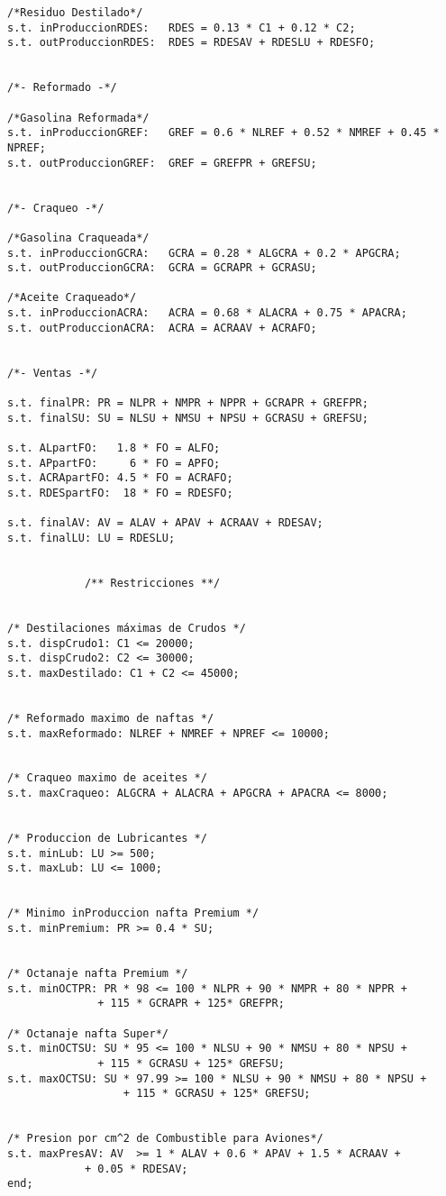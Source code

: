 \documentclass[a4paper,10pt]{article}
\begin{document}
\begin{verbatim}
/*Residuo Destilado*/
s.t. inProduccionRDES:   RDES = 0.13 * C1 + 0.12 * C2;
s.t. outProduccionRDES:  RDES = RDESAV + RDESLU + RDESFO;


/*- Reformado -*/

/*Gasolina Reformada*/
s.t. inProduccionGREF:   GREF = 0.6 * NLREF + 0.52 * NMREF + 0.45 * NPREF;
s.t. outProduccionGREF:  GREF = GREFPR + GREFSU;


/*- Craqueo -*/

/*Gasolina Craqueada*/
s.t. inProduccionGCRA:   GCRA = 0.28 * ALGCRA + 0.2 * APGCRA;
s.t. outProduccionGCRA:  GCRA = GCRAPR + GCRASU;

/*Aceite Craqueado*/
s.t. inProduccionACRA:   ACRA = 0.68 * ALACRA + 0.75 * APACRA;
s.t. outProduccionACRA:  ACRA = ACRAAV + ACRAFO;


/*- Ventas -*/

s.t. finalPR: PR = NLPR + NMPR + NPPR + GCRAPR + GREFPR;
s.t. finalSU: SU = NLSU + NMSU + NPSU + GCRASU + GREFSU;

s.t. ALpartFO: 	 1.8 * FO = ALFO;
s.t. APpartFO: 	   6 * FO = APFO;
s.t. ACRApartFO: 4.5 * FO = ACRAFO;
s.t. RDESpartFO:  18 * FO = RDESFO;

s.t. finalAV: AV = ALAV + APAV + ACRAAV + RDESAV;
s.t. finalLU: LU = RDESLU;


			/** Restricciones **/

			
/* Destilaciones máximas de Crudos */
s.t. dispCrudo1: C1 <= 20000;
s.t. dispCrudo2: C2 <= 30000;
s.t. maxDestilado: C1 + C2 <= 45000;


/* Reformado maximo de naftas */
s.t. maxReformado: NLREF + NMREF + NPREF <= 10000;


/* Craqueo maximo de aceites */
s.t. maxCraqueo: ALGCRA + ALACRA + APGCRA + APACRA <= 8000;


/* Produccion de Lubricantes */
s.t. minLub: LU >= 500;
s.t. maxLub: LU <= 1000;


/* Minimo inProduccion nafta Premium */
s.t. minPremium: PR >= 0.4 * SU;


/* Octanaje nafta Premium */
s.t. minOCTPR: PR * 98 <= 100 * NLPR + 90 * NMPR + 80 * NPPR +
			  + 115 * GCRAPR + 125* GREFPR;

/* Octanaje nafta Super*/
s.t. minOCTSU: SU * 95 <= 100 * NLSU + 90 * NMSU + 80 * NPSU +
			  + 115 * GCRASU + 125* GREFSU;
s.t. maxOCTSU: SU * 97.99 >= 100 * NLSU + 90 * NMSU + 80 * NPSU +
			      + 115 * GCRASU + 125* GREFSU;

			      
/* Presion por cm^2 de Combustible para Aviones*/
s.t. maxPresAV: AV  >= 1 * ALAV + 0.6 * APAV + 1.5 * ACRAAV +
			+ 0.05 * RDESAV;
end;
\end{verbatim}
\end{document}
